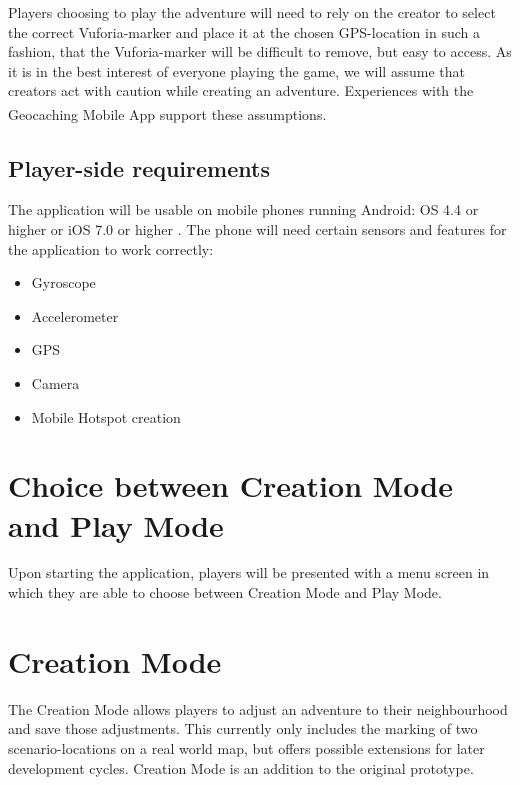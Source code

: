 \documentclass{sigchi-ext}
\begin{document}
Players choosing to play the adventure will need to rely on the creator to select the correct Vuforia-marker and place it at the chosen GPS-location in such a fashion, that the Vuforia-marker will be difficult to remove, but easy to access. As it is in the best interest of everyone playing the game, we will assume that creators act with caution while creating an adventure. Experiences with the Geocaching\textsuperscript{\textregistered} Mobile App \cite{app:geocaching} support these assumptions.

\subsection{Player-side requirements}

The application will be usable on mobile phones running Android: OS 4.4 or higher or iOS 7.0 or higher \cite{unityRequirements}. The phone will need certain sensors and features for the application to work correctly:

\begin{itemize}\compresslist%
	\item Gyroscope
	\item Accelerometer
	\item GPS
	\item Camera
	\item Mobile Hotspot creation \cite{desc:hotspot}
\end{itemize}

\section{Choice between Creation Mode and Play Mode}

Upon starting the application, players will be presented with a menu screen in which they are able to choose between Creation Mode and Play Mode.


\section{Creation Mode} 
\label{sec:Creation}

The Creation Mode allows players to adjust an adventure to their neighbourhood and save those adjustments. This currently only includes the marking of two scenario-locations on a real world map, but offers possible extensions for later development cycles. Creation Mode is an addition to the original prototype.
\end{document}

